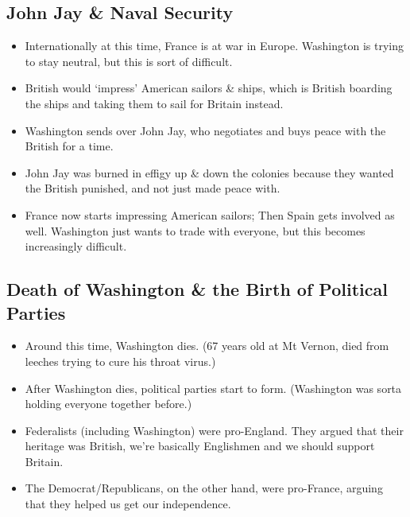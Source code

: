 \documentclass{article}
\begin{document}
    \subsection{John Jay \& Naval Security}
      \begin{itemize}
        \item Internationally at this time, France is at war in Europe. Washington is trying to stay neutral, but this is sort of difficult.
        \item British would `impress' American sailors \& ships, which is British boarding the ships and taking them to sail for Britain instead.
        \item Washington sends over John Jay, who negotiates and buys peace with the British for a time.
        \item John Jay was burned in effigy up \& down the colonies because they wanted the British punished, and not just made peace with.
        \item France now starts impressing American sailors; Then Spain gets involved as well. Washington just wants to trade with everyone, but this becomes increasingly difficult.
      \end{itemize}
    \subsection{Death of Washington \& the Birth of Political Parties}
      \begin{itemize}
        \item Around this time, Washington dies. (67 years old at Mt Vernon, died from leeches trying to cure his throat virus.)
        \item After Washington dies, political parties start to form. (Washington was sorta holding everyone together before.) 
        \item Federalists (including Washington) were pro-England. They argued that their heritage was British, we're basically Englishmen and we should support Britain.
        \item The Democrat/Republicans, on the other hand, were pro-France, arguing that they helped us get our independence. 
      \end{itemize}
\end{document}
